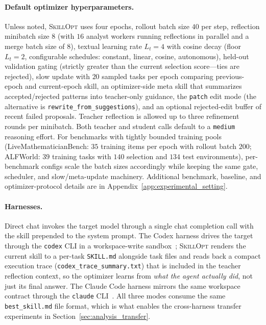 \documentclass{llmxive}
\providecommand{\ourmethod}{\textsc{SkillOpt}\xspace}
\begin{document}
\paragraph{Default optimizer hyperparameters.}
Unless noted, \ourmethod{} uses four epochs, rollout batch size $40$ per step, reflection minibatch size $8$ (with $16$ analyst workers running reflections in parallel and a merge batch size of $8$), textual learning rate $L_t=4$ with cosine decay (floor $L_t=2$, configurable schedules: constant, linear, cosine, autonomous), held-out validation gating (strictly greater than the current selection score---ties are rejected), slow update with $20$ sampled tasks per epoch comparing previous-epoch and current-epoch skill, an optimizer-side meta skill that summarizes accepted/rejected patterns into teacher-only guidance, the \texttt{patch} edit mode (the alternative is \texttt{rewrite\_from\_suggestions}), and an optional rejected-edit buffer of recent failed proposals. Teacher reflection is allowed up to three refinement rounds per minibatch. Both teacher and student calls default to a \texttt{medium} reasoning effort. For benchmarks with tightly bounded training pools (LiveMathematicianBench: $35$ training items per epoch with rollout batch $200$; ALFWorld: $39$ training tasks with $140$ selection and $134$ test environments), per-benchmark configs scale the batch sizes accordingly while keeping the same gate, scheduler, and slow/meta-update machinery. Additional benchmark, baseline, and optimizer-protocol details are in Appendix~\ref{app:experimental_setting}.

\paragraph{Harnesses.}
Direct chat invokes the target model through a single chat completion call with the skill prepended to the system prompt. The Codex harness drives the target through the \texttt{codex} CLI in a workspace-write sandbox~\citep{openai2025codex}; \ourmethod{} renders the current skill to a per-task \texttt{SKILL.md} alongside task files and reads back a compact execution trace (\texttt{codex\_trace\_summary.txt}) that is included in the teacher reflection context, so the optimizer learns from \emph{what the agent actually did}, not just its final answer. The Claude Code harness mirrors the same workspace contract through the \texttt{claude} CLI~\citep{anthropic2025claudecode}. All three modes consume the same \texttt{best\_skill.md} file format, which is what enables the cross-harness transfer experiments in Section~\ref{sec:analysis_transfer}.
\end{document}
